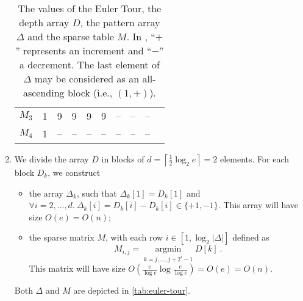 \begin{enumerate}
\begin{table}[t]
\begin{tabular}{|r||c|c|c|c|c|c|c|c|c|c|c|c|c|c|c|c|}
           $M_3$ & \multicolumn{2}{c|}{1} & \multicolumn{2}{c|}{9} &
                   \multicolumn{2}{c|}{9} & \multicolumn{2}{c|}{9} &
                   \multicolumn{2}{c|}{9} & \multicolumn{2}{c|}{--} &
                   \multicolumn{2}{c|}{--} & \multicolumn{1}{c|}{--} \\
           $M_4$ & \multicolumn{2}{c|}{1} & \multicolumn{2}{c|}{--} &
                   \multicolumn{2}{c|}{--} & \multicolumn{2}{c|}{--} &
                   \multicolumn{2}{c|}{--} & \multicolumn{2}{c|}{--} &
                   \multicolumn{2}{c|}{--} & \multicolumn{1}{c|}{--} \\\hline
    \end{tabular}

    \caption{The values of the Euler Tour, the depth array $D$, the pattern
    array $\Delta$ and the sparse table $M$. In \Delta, ``$+$'' represents an
    increment and ``$-$'' a decrement. The last element of $\Delta$ may be
    considered as an all-ascending block (i.e., $(1, +)$).}

    \label{tab:euler-tour}

  \end{table}

  \item We divide the array $D$ in blocks of $d = \left\lceil \frac{1}{2}\log_2
  e \right\rceil = 2$ elements. For each block $D_k$, we construct
  \begin{itemize}

    \item the array $\Delta_k$, such that $\Delta_k[1] = D_k[1]$ and $\forall i
    = 2, \dots, d.\ \Delta_k[i] = D_k[i] - D_k[i] \in \{+1, -1\}$. This array
    will have size $O(e) = O(n)$;

    \item the sparse matrix $M$, with each row $i \in [1, \log_2 |\Delta|]$
    defined as $$M_{i, j} = \operatorname*{argmin}_{k = j, \dots, j + 2^i - 1}
    D[k]\ .$$ This matrix will have size $O(\frac{e}{\log e}\log\frac{e}{\log
    e}) = O(e) = O(n)$.

  \end{itemize}
  Both $\Delta$ and $M$ are depicted in \autoref{tab:euler-tour}.


\end{enumerate}
